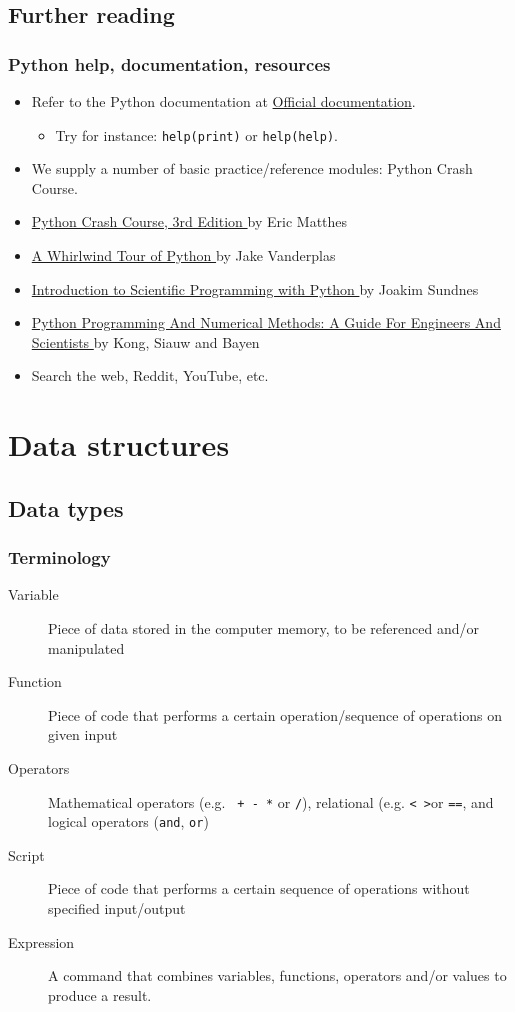 \subsection{Further reading}
\begin{frame}[fragile]
\frametitle{Python help, documentation, resources}
\begin{itemize}[<+->]
  \item Refer to the Python documentation at \href{https://docs.python.org/3/}{Official documentation}.
  \begin{itemize}
    \item Try for instance: \lstinline$help(print)$ or \lstinline$help(help)$.
  \end{itemize}
  \item We supply a number of basic practice/reference modules: Python Crash Course.
  \item \href{https://tue.on.worldcat.org/oclc/1346554335}{Python Crash Course, 3rd Edition \faExternalLink} by Eric Matthes
  \item \href{https://tue.on.worldcat.org/oclc/1023864062}{A Whirlwind Tour of Python \faExternalLink} by Jake Vanderplas
  \item \href{https://tue.on.worldcat.org/oclc/1164494156}{Introduction to Scientific Programming with Python \faExternalLink} by Joakim Sundnes
  \item \href{https://pythonnumericalmethods.berkeley.edu/notebooks/Index.html}{Python Programming And Numerical Methods: A Guide For Engineers And Scientists \faExternalLink} by Kong, Siauw and Bayen
  \item Search the web, Reddit, YouTube, etc.
\end{itemize}
\end{frame}

\section{Data structures}
\subsection{Data types}
\begin{frame}
 \frametitle{Terminology}
 \begin{description}
  \item[Variable] Piece of data stored in the computer memory, to be referenced and/or manipulated
  \item[Function] Piece of code that performs a certain operation/sequence of operations on given input
  \item[Operators] Mathematical operators (e.g. \lstinline$ + - *$ or \lstinline$/$), relational (e.g. \lstinline$< >$or \lstinline$==$, and logical operators (\lstinline$and$, \lstinline$or$)
  \item[Script] Piece of code that performs a certain sequence of operations without specified input/output
  \item[Expression] A command that combines variables, functions, operators and/or values to produce a result.
 \end{description}
\end{frame}

